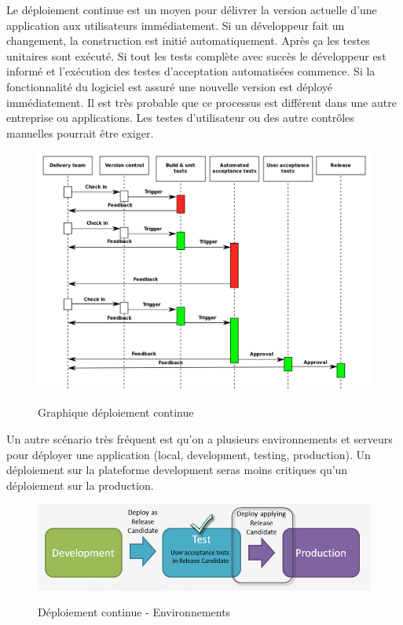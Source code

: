 Le déploiement continue est un moyen pour délivrer la version actuelle d'une application aux utilisateurs immédiatement. Si un développeur fait un changement, la construction est initié automatiquement. Après ça les testes unitaires sont exécuté. Si tout les tests complète avec succès  le développeur est informé et l'exécution des testes d'acceptation automatisées commence. Si la fonctionnalité du logiciel est assuré une nouvelle version est déployé immédiatement.
Il est très probable que ce processus est différent dans une autre entreprise ou applications. Les testes d'utilisateur ou des autre contrôles manuelles pourrait être exiger.\\
\begin{figure}[H]
\centering
\includegraphics[width=15cm]{bilder/Continuous_Delivery}
\caption{Graphique déploiement continue}\cite{wikicd}
\label{fig:continousdelivery}
\end{figure}

Un autre scénario très fréquent est qu'on a plusieurs environnements et serveurs pour déployer une application (local, development, testing, production). Un déploiement sur la plateforme development seras moins critiques qu'un déploiement sur la production.

\begin{figure}[H]
\centering
\includegraphics[width=15cm]{bilder/Deployment_ci}
\caption{Déploiement continue - Environnements}\cite{bizagigraphique}
\label{fig:continousdelivery}
\end{figure}